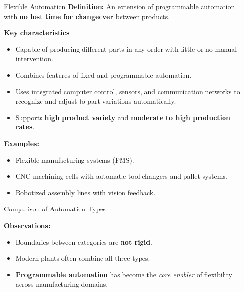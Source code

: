 \begin{frame}{Flexible Automation}
\textbf{Definition:}  
An extension of programmable automation with \textbf{no lost time for changeover} between products.

\vspace{2mm}
\textbf{Key characteristics}
\begin{itemize}
  \item Capable of producing different parts in any order with little or no manual intervention.
  \item Combines features of fixed and programmable automation.
  \item Uses integrated computer control, sensors, and communication networks to recognize and adjust to part variations automatically.
  \item Supports \textbf{high product variety} and \textbf{moderate to high production rates}.
\end{itemize}

\vspace{3mm}
\textbf{Examples:}
\begin{itemize}
  \item Flexible manufacturing systems (FMS).
  \item CNC machining cells with automatic tool changers and pallet systems.
  \item Robotized assembly lines with vision feedback.
\end{itemize}
\end{frame}

\begin{frame}{Comparison of Automation Types}
\centering
{}


\vspace{4mm}
\textbf{Observations:}
\begin{itemize}
  \item Boundaries between categories are \textbf{not rigid}.
  \item Modern plants often combine all three types.
  \item \textbf{Programmable automation} has become the \emph{core enabler} of flexibility across manufacturing domains.
\end{itemize}
\end{frame}

